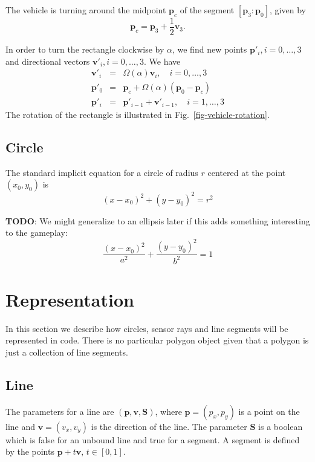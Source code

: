 \documentclass[11pt]{article}
\newcommand{\pb}{\mathbf{p}}
\newcommand{\Sb}{\mathbf{S}}
\newcommand{\vb}{\mathbf{v}}
\newcommand{\figref}[1]{Fig.~\eqref{#1}}
\newcommand{\TODO}{{\bf TODO}}
\newcommand{\true}{\textsf{true}}
\newcommand{\false}{\textsf{false}}
\begin{document}
The vehicle is turning around the midpoint $\pb_c$ of the segment 
$[\pb_3:\pb_0]$, given by 
\begin{equation*}
    \pb_c = \pb_3 + \frac{1}{2}\vb_3.
\end{equation*}

In order to turn the rectangle clockwise by $\alpha$, we find new points 
$\pb'_i,i=0,\ldots,3$ and directional vectors $\vb'_i,i=0,\ldots,3$.
We have
\begin{eqnarray}
    \vb'_i &=& \Omega(\alpha)\vb_i,\quad i=0,\ldots,3 \\
    \pb'_0 &=& \pb_c + \Omega(\alpha)(\pb_0 - \pb_c) \\
    \pb'_i &=& \pb'_{i-1} + \vb'_{i-1},\quad i=1,\ldots,3
\end{eqnarray}
The rotation of the rectangle is illustrated in \figref{fig-vehicle-rotation}.

\subsection{Circle}
\label{sec-circle}

The standard implicit equation for a circle of radius $r$  centered at the
point $(x_0, y_0)$ is
\begin{equation}
    (x - x_0)^2 + (y - y_0)^2 = r^2\label{eq-circle}
\end{equation}

\TODO: We might generalize to an ellipsis later if this adds something
interesting to the gameplay:
\begin{equation}
    \frac{(x-x_0)^2}{a^2} + \frac{(y-y_0)^2}{b^2} = 1
\end{equation}

\section{Representation}
\label{sec-representation}
In this section we describe how circles, sensor rays and line segments will be
represented in code. There is no particular polygon object given that a
polygon is just a collection of line segments.

\subsection{Line}
\label{sec-representation-line}

The parameters for a line are $(\pb, \vb, \Sb)$, where $\pb=(p_{x}, p_{y})$ is
a point on the line and $\vb=(v_{x}, v_{y})$ is the direction of the line. The
parameter $\Sb$ is a boolean which is \false{} for an unbound line and \true{}
for a segment. A segment is defined by the points $\pb+t\vb,\,t\in[0,1]$.
\end{document}
